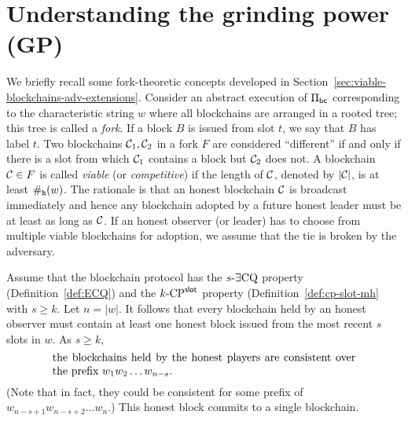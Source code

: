 






\section{Understanding the grinding power (GP)}

We briefly recall some fork-theoretic concepts
developed in Section~\ref{sec:viable-blockchains-adv-extensions}. 
Consider an abstract execution of $\Pi_\mathsf{bc}$ 
corresponding to the characteristic string $w$
where 
all blockchains are arranged in a rooted tree; 
this tree is called a \emph{fork}. 
If a block $B$ is issued from slot $t$, 
we say that $B$ has label $t$.
Two blockchains $\mathcal{C}_1, \mathcal{C}_2$ in a fork $F$ are considered ``different'' 
if and only if there is a slot from which 
$\mathcal{C}_1$ contains a block but $\mathcal{C}_2$ does not. 
A blockchain $\mathcal{C} \in F$ is called \emph{viable} (or \emph{competitive}) 
if the length of $\mathcal{C}$, denoted by $|\mathcal{C}|$, 
is at least $\#_{\mathtt{h}}(w)$. 
The rationale is that an honest blockchain $\mathcal{C}$ is broadcast immediately 
and hence any blockchain adopted by a future honest leader
must be at least as long as $\mathcal{C}$. 
If an honest observer (or leader) has to choose from multiple viable blockchains for adoption, 
we assume that the tie is broken by the adversary. 

Assume that the blockchain protocol 
has the ${s}\text{-}\exists\mathrm{CQ}$ property (Definition~\ref{def:ECQ}) 
and the ${k}\text{-}\mathrm{CP}^{\mathsf{slot}}$ property (Definition~\ref{def:cp-slot-mh} 
with $s \geq k$. 
Let $n = |w|$.
It follows that 
every blockchain held by an honest observer must contain 
at least one honest block 
issued from the most recent $s$ slots in $w$. 
As $s \geq k$, 
\begin{equation}
  \parbox{0.8\textwidth}{the blockchains held by the honest players 
    are consistent 
    over the prefix $w_1 w_2 \ldots w_{n-s}$.
  }
  \label{eq:last-honest-block-praos}
\end{equation}
(Note that in fact, they could be consistent for some prefix of $w_{n-s+1} w_{n-s+2} \ldots w_n$.)
This honest block commits to a single blockchain. 

